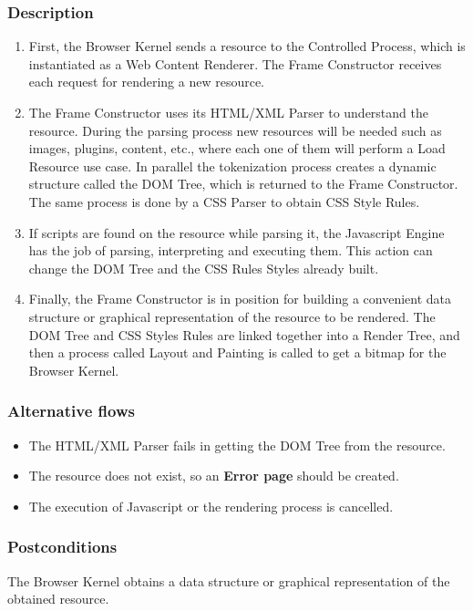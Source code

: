 \documentclass[prodmode,acmtecs]{acmsmall}
\begin{document}
    \subsubsection*{Description}
      \begin{enumerate}\leftskip2.5em
        \item First, the Browser Kernel sends a resource to the Controlled Process, which is instantiated as a Web Content Renderer. The Frame Constructor receives each request for rendering a new resource.
        \item The Frame Constructor uses its HTML/XML Parser to understand the resource. During the parsing process new resources will be needed such as images, plugins, content, etc., where each one of them will perform a Load Resource use case. In parallel the tokenization process creates a dynamic structure called the DOM Tree, which is returned to the Frame Constructor. The same process is done by a CSS Parser to obtain CSS Style Rules.
        \item If scripts are found on the resource while parsing it, the Javascript Engine has the job of parsing, interpreting and executing them. This action can change the DOM Tree and the CSS Rules Styles already built.
        \item Finally, the Frame Constructor is in position for building a convenient data structure or graphical representation of the resource to be rendered. The DOM Tree and CSS Styles Rules are linked together into a Render Tree, and then a process called Layout and Painting is called to get a bitmap \cite{gpuchrome,gecko2} for the Browser Kernel.
      \end{enumerate}

    \subsubsection*{Alternative flows} 
    \begin{itemize}\leftskip2.2em
    \item The HTML/XML Parser fails in getting the DOM Tree from the resource.
    \item The resource does not exist, so an \textbf{Error page} should be created. 
    \item The execution of Javascript or the rendering process is cancelled.
      \end{itemize}
    \subsubsection*{Postconditions} The Browser Kernel obtains a data structure or graphical representation of the obtained resource.
\end{document}
